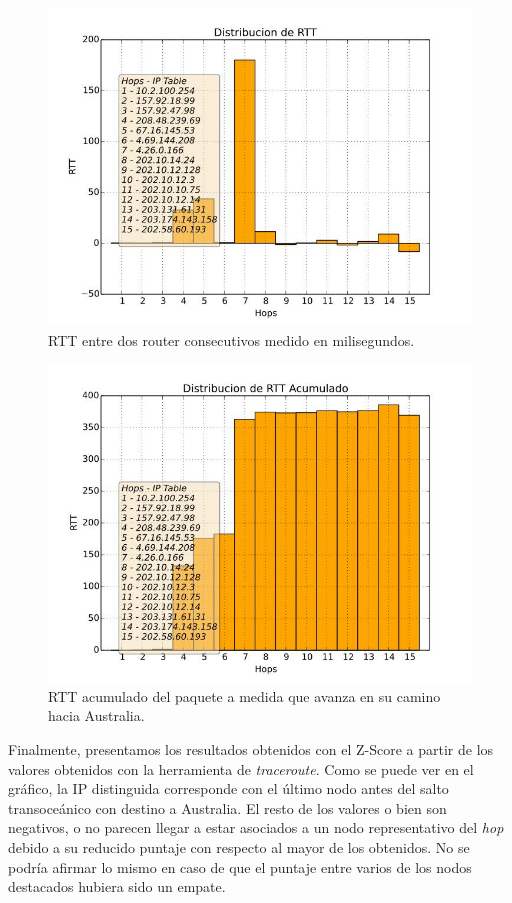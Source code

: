 \begin{figure}[H]
  \centering	
	\includegraphics[scale=0.3]{../australia-experiment/bar_rtt.jpeg}
  \caption{RTT entre dos router consecutivos medido en milisegundos.}
	\label{fig:histo-src-sitiotrabajo}
\end{figure}

\begin{figure}[H]
  \centering	
	\includegraphics[scale=0.3]{../australia-experiment/bar_rtt_acum.jpeg}
  \caption{RTT acumulado del paquete a medida que avanza en su camino hacia Australia.}
	\label{fig:histo-src-sitiotrabajo}
\end{figure}

Finalmente, presentamos los resultados obtenidos con el Z-Score a partir de los valores obtenidos con la herramienta de \textit{traceroute}. Como se puede ver en el gráfico, la IP distinguida corresponde con el último nodo antes del salto transoceánico con destino a Australia. El resto de los valores o bien son negativos, o no parecen llegar a estar asociados a un nodo representativo del \textit{hop} debido a su reducido puntaje con respecto al mayor de los obtenidos. No se podría afirmar lo mismo en caso de que el puntaje entre varios de los nodos destacados hubiera sido un empate. 

